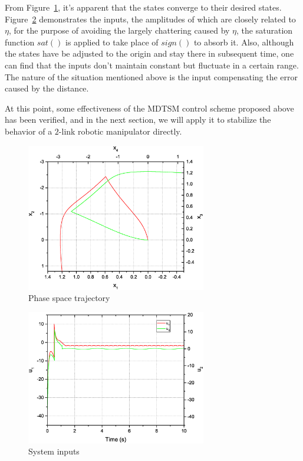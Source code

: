 \documentclass[3p]{elsarticle}
\theoremstyle{plain}
\theoremstyle{remark}
\begin{document}
From Figure~\ref{Figure:2}, it's apparent that the states converge to their desired states. Figure~\ref{Figure:3} demonstrates the inputs, the amplitudes of which are closely related to $\eta$, for the purpose of avoiding the largely chattering caused by $\eta$, the saturation function $sat()$ is applied to take place of $sign()$ to absorb it. Also, although the states have be adjusted to the origin and stay there in subsequent time, one can find that the inputs don't maintain constant but fluctuate in a certain range. The nature of the situation mentioned above is the input compensating the error caused by the distance.\par
At this point, some effectiveness of the MDTSM control scheme proposed above has been verified, and in the next section, we will apply it to stabilize the behavior of a $2$-link robotic manipulator directly.
\begin{figure}
\centering
\includegraphics[width=0.7\textwidth]{paper3_fig2.eps}
\caption{Phase space trajectory}
\label{Figure:2}
\end{figure}

\begin{figure}
\centering
\includegraphics[width=0.7\textwidth]{paper3_fig3.eps}
\caption{System inputs}
\label{Figure:3}
\end{figure}
\end{document}
